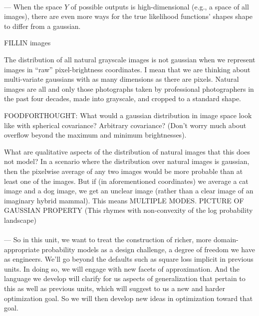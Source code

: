 \documentclass[12pt]{article}
\begin{document}
        \paragraph{\sf} ---
        When the space $Y$ of possible outputs
        is high-dimensional (e.g., a space of all images), there are even more
        ways for the true likelihood functions' shapes shape to differ from a
        gaussian.

        FILLIN images

        The distribution of all natural grayscale images is not gaussian when
        we represent images in ``raw'' pixel-brightness coordinates.  I mean
        that we are thinking about multi-variate gaussians with as many
        dimensions as there are pixels.  Natural images are all and only those
        photographs taken by professional photographers in the past four
        decades, made into grayscale, and cropped to a standard shape.
        \par
        FOODFORTHOUGHT: What would a gaussian distribution in image space look
        like with spherical covariance?  Arbitrary covariance?  (Don't worry
        much about overflow beyond the maximum and minimum brightnesses).
        \par
        What
        are qualitative aspects of the distribution of natural images that this
        does not model?
        In a scenario where the distribution over natural images is gaussian,
        then the pixelwise average of any two images would be more probable
        than at least one of the images.  But if (in aforementioned
        coordinates) we average a cat image and a dog image, we get an unclear
        image (rather than a clear image of an imaginary hybrid mammal).
        This means MULTIPLE MODES.
        PICTURE OF GAUSSIAN PROPERTY
        (This rhymes with non-convexity of the log probability landscape)

        \paragraph{\sf} --- So in this unit, we want to treat the construction
        of richer, more domain-appropriate probability models as a design
        challenge, a degree of freedom we have as engineers.  We'll go beyond
        the defaults such as square loss implicit in previous units.  In doing
        so, we will engage with new facets of approximation.  And the language
        we develop will clarify for us aspects of generalization that pertain
        to this as well as previous units, which will suggest to us a new and
        harder optimization goal.  So we will then develop new ideas in
        optimization toward that goal.
\end{document}
